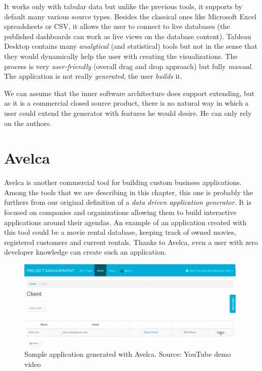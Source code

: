 It works only with tabular data but unlike the previous tools, it supports by default many various source types. Besides the classical ones like Microsoft Excel spreadsheets or CSV, it allows the user to connect to live databases (the published dashboards can work as live views on the database content). Tableau Desktop contains many \emph{analytical} (and statistical) tools but not in the sense that they would dynamically help the user with creating the visualizations. The process is very \emph{user-friendly} (overall drag and drop approach) but fully \emph{manual}. The application is not really \emph{generated}, the user \emph{builds} it.

We can assume that the inner software architecture does support extending, but as it is a commercial closed source product, there is no natural way in which a user could extend the generator with features he would desire. He can only rely on the authors.

\section{Avelca}

Avelca \cite{avelca} is another commercial tool for building custom business applications. Among the tools that we are describing in this chapter, this one is probably the furthers from our original definition of a \emph{data driven application generator}. It is focused on companies and organizations allowing them to build interactive applications around their agendas. An example of an application created with this tool could be a movie rental database, keeping track of owned movies, registered customers and current rentals. Thanks to Avelca, even a user with zero developer knowledge can create such an application.

\begin{figure}
	\centering
	\includegraphics[width=110mm]{img/02_avelca.png}
	\caption{Sample application generated with Avelca. Source: YouTube demo video \cite{avelca_youtube}}
	\label{fig:avelca-example}
\end{figure}

